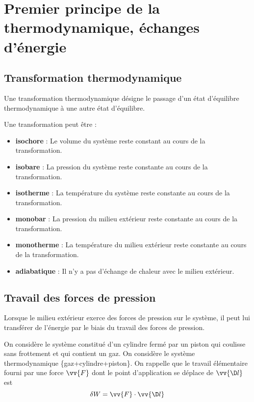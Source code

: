 \documentclass{cours}
\begin{document}
\setcounter{chapter}{16}
\chapter{Premier principe de la thermodynamique, échanges d'énergie}
\label{chap:premier_principe}

\section{Transformation thermodynamique}%
\label{sec:transformation_thermodynamique}
\begin{definition}
  Une transformation thermodynamique désigne le passage d'un état d'équilibre thermodynamique à une autre état d'équilibre.
\end{definition}

Une transformation peut être :
\begin{itemize}
  \item \textbf{isochore} : Le volume du système reste constant au cours de la transformation. 
  \item \textbf{isobare} : La pression du système reste constante au cours de la transformation. 
  \item \textbf{isotherme} : La température du système reste constante au cours de la transformation. 
  \item \textbf{monobar} : La pression du milieu extérieur reste constante au cours de la transformation. 
  \item \textbf{monotherme} : La température du milieu extérieur reste constante au cours de la transformation. 
  \item \textbf{adiabatique} : Il n'y a pas d'échange de chaleur avec le milieu extérieur.
\end{itemize}

\section{Travail des forces de pression}%
\label{sec:travail_des_forces_de_pression}
Lorsque le milieu extérieur exerce des forces de pression sur le système, il peut lui transférer de l'énergie par le biais du travail des forces de pression.

On considère le système constitué d'un cylindre fermé par un piston qui coulisse sans frottement et qui contient un gaz. On considère le système thermodynamique \{gaz+cylindre+piston\}.
On rappelle que le travail élémentaire fourni par une force $\vv{F}$ dont le point d'application se déplace de $\vv{\D l}$ est 
\begin{equation}
  \delta W = \vv{F}\cdot \vv{\D l}
\end{equation}
\end{document}
